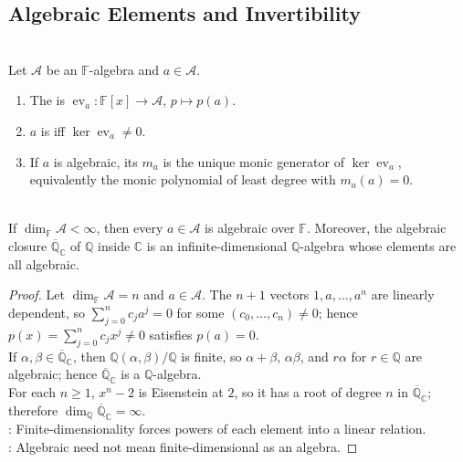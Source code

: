 \subsection{Algebraic Elements and Invertibility}

\begin{definition} \label{def:algebraic-element-minimal-polynomial-algebra} \\
Let $\mathcal{A}$ be an $\mathbb{F}$-algebra and $a\in\mathcal{A}$.
\begin{enumerate}[label=(\roman*)]
\setlength{\itemsep}{0pt}
\item The  is $\operatorname{ev}_a:\mathbb{F}[x]\to\mathcal{A}$, $p\mapsto p(a)$.
\item $a$ is  iff $\ker\operatorname{ev}_a\neq0$.
\item If $a$ is algebraic, its  $m_a$ is the unique monic generator of $\ker\operatorname{ev}_a$, equivalently the monic polynomial of least degree with $m_a(a)=0$.
\end{enumerate}
\end{definition}

\begin{theorem} \label{thm:finite-dimensional-algebras-algebraic-elements} \\
If $\dim_{\mathbb{F}}\mathcal{A}<\infty$, then every $a\in\mathcal{A}$ is algebraic over $\mathbb{F}$. Moreover, the algebraic closure $\overline{\mathbb{Q}}_{\mathbb{C}}$ of $\mathbb{Q}$ inside $\mathbb{C}$ is an infinite-dimensional $\mathbb{Q}$-algebra whose elements are all algebraic.
\begin{proof}
Let $\dim_{\mathbb{F}}\mathcal{A}=n$ and $a\in\mathcal{A}$. The $n+1$ vectors $1,a,\ldots,a^n$ are linearly dependent, so $\sum_{j=0}^{n}c_ja^j=0$ for some $(c_0,\ldots,c_n)\neq0$; hence $p(x)=\sum_{j=0}^{n}c_jx^j\neq0$ satisfies $p(a)=0$.\\
If $\alpha,\beta\in\overline{\mathbb{Q}}_{\mathbb{C}}$, then $\mathbb{Q}(\alpha,\beta)/\mathbb{Q}$ is finite, so $\alpha+\beta$, $\alpha\beta$, and $r\alpha$ for $r\in\mathbb{Q}$ are algebraic; hence $\overline{\mathbb{Q}}_{\mathbb{C}}$ is a $\mathbb{Q}$-algebra.\\
For each $n\geq1$, $x^n-2$ is Eisenstein at $2$, so it has a root of degree $n$ in $\overline{\mathbb{Q}}_{\mathbb{C}}$; therefore $\dim_{\mathbb{Q}}\overline{\mathbb{Q}}_{\mathbb{C}}=\infty$.\\
: Finite-dimensionality forces powers of each element into a linear relation.\\
: Algebraic need not mean finite-dimensional as an algebra.
\end{proof}
\end{theorem}


